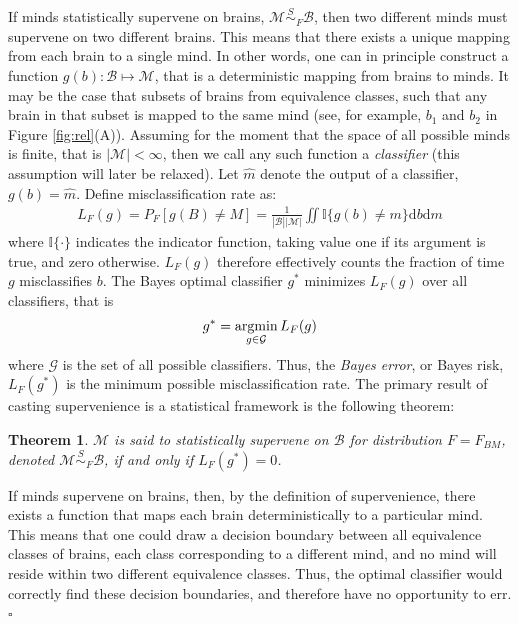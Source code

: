 \documentclass{article}
\newcommand{\mB}{\mathcal{B}}
\newcommand{\mM}{\mathcal{M}}
\newcommand{\II}{\mathbb{I}}           %
\providecommand{\mc}[1]{\mathcal{#1}}
\providecommand{\mh}[1]{\widehat{#1}}
\newcommand{\argmin}{\operatornamewithlimits{argmin}}
\newcommand{\MsB}{\mM \overset{S}{\sim}_F \mB}
\newtheorem{thm}{Theorem}
\begin{document}
If minds statistically supervene on brains, $\MsB$, then two different minds must supervene on two different brains.  This means that there exists a unique mapping from each brain to a single mind.  In other words, one can in principle construct a function $g(b): \mB \mapsto \mM$, that is a deterministic mapping from brains to minds.  It may be the case that subsets of brains from equivalence classes, such that any brain in that subset is mapped to the same mind (see, for example, $b_1$ and $b_2$ in Figure \ref{fig:rel}(A)).  Assuming for the moment that the space of all possible minds is finite, that is $| \mM| < \infty$, then we call any such function a \emph{classifier} (this assumption will later be relaxed).  Let $\mh{m}$ denote the output of a classifier, $g(b)=\mh{m}$.  Define misclassification rate as:
\begin{align}
	L_F(g) = P_{F}[g(B) \neq M] = \frac{1}{|\mB| |\mM|}\iint \II\{g(b)\neq m\} \text{d}b \text{d}m
\end{align}
where $\II\{\cdot\}$ indicates the indicator function, taking value one if its argument is true, and zero otherwise.  $L_F(g)$ therefore effectively counts the fraction of time $g$ misclassifies $b$. The Bayes optimal classifier $g^*$ minimizes $L_{F}(g)$ over all classifiers, that is
\begin{align}
	g^* = \argmin_{g \in \mc{G}} L_F(g)
\end{align}
where $\mc{G}$ is the set of all possible classifiers.  Thus, the \emph{Bayes error}, or Bayes risk, $L_F(g^*)$ is the minimum possible misclassification rate. The primary result of casting supervenience is a statistical framework is the following theorem: 
\begin{thm}
\label{thm1} 
$\mM$ is said to \textit{statistically supervene} on $\mB$ for distribution $F=F_{BM}$, denoted $\mM \overset{S}{\sim}_F \mB$, if and only if $L_{F}(g^*) = 0$.
\end{thm}

\noindent If minds supervene on brains, then, by the definition of supervenience, there exists a function that maps each brain deterministically to a particular mind.  This means that one could draw a decision boundary between all equivalence classes of brains, each class corresponding to a different mind, and no mind will reside within two different equivalence classes.  Thus, the optimal classifier would correctly find these decision boundaries, and therefore have no opportunity to err. $\square$
\end{document}
